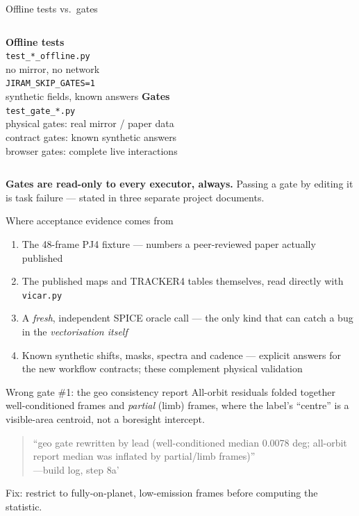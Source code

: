 \documentclass[aspectratio=169,11pt]{beamer}
\newcommand{\currevsec}{}
\newcommand{\revsec}[1]{\gdef\currevsec{#1}}
\begin{document}
\begin{frame}{Offline tests vs.\ gates}
  \revsec{5}
  \begin{columns}
    \textbf{Offline tests}\\
    \small \texttt{test\_*\_offline.py}\\
    no mirror, no network\\
    \texttt{JIRAM\_SKIP\_GATES=1}\\
    synthetic fields, known answers
    \textbf{Gates}\\
    \small \texttt{test\_gate\_*.py}\\
    physical gates: real mirror / paper data\\
    contract gates: known synthetic answers\\
    browser gates: complete live interactions
  \end{columns}
  \vspace{0.3cm}
  \textbf{Gates are read-only to every executor, always.} Passing a gate by editing it is task failure --- stated in three separate project documents.
\end{frame}

\begin{frame}{Where acceptance evidence comes from}
  \revsec{5}
  \begin{enumerate}
    \item The 48-frame PJ4 fixture --- numbers a peer-reviewed paper actually published
    \item The published maps and TRACKER4 tables themselves, read directly with \texttt{vicar.py}
    \item A \emph{fresh}, independent SPICE oracle call --- the only kind that can catch a bug in the \emph{vectorisation itself}
    \item Known synthetic shifts, masks, spectra and cadence --- explicit answers for the new workflow contracts; these complement physical validation
  \end{enumerate}
\end{frame}

\begin{frame}{Wrong gate \#1: the geo consistency report}
  \revsec{5}
  All-orbit residuals folded together well-conditioned frames and \emph{partial} (limb) frames, where the label's ``centre'' is a visible-area centroid, not a boresight intercept.
  \begin{quote}\small
    ``geo gate rewritten by lead (well-conditioned median 0.0078 deg; all-orbit report median was inflated by partial/limb frames)''\\
    \hfill---build log, step 8a'
  \end{quote}
  Fix: restrict to fully-on-planet, low-emission frames before computing the statistic.
\end{frame}
\end{document}
